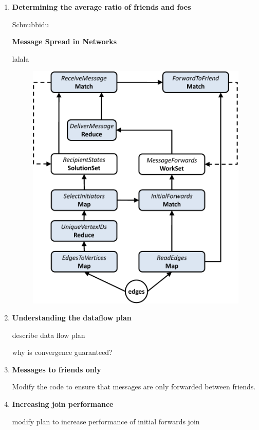 \documentclass[11pt,a4paper]{article}
\begin{document}
\begin{enumerate}
\item \textbf{Determining the average ratio of friends and foes}

Schnubbidu

\vspace{5em}
\centerline{\textbf{Message Spread in Networks}}

lalala

		\begin{figure}[h]
			\begin{center}
				\includegraphics[scale=0.5]{chainletter-plan-crop.pdf}
			\end{center}
		\end{figure}


\item \textbf{Understanding the dataflow plan}

describe data flow plan

why is convergence guaranteed?

\item \textbf{Messages to friends only}

Modify the code to ensure that messages are only forwarded between friends.

\item \textbf{Increasing join performance}

modify plan to increase performance of initial forwards join 



\end{enumerate}
\end{document}
